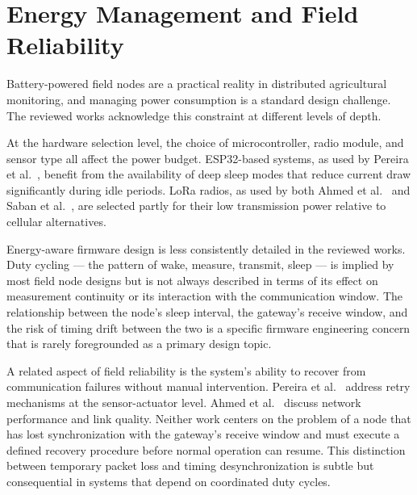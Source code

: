 \section{Energy Management and Field Reliability}
\label{sec:energy-reliability}

Battery-powered field nodes are a practical reality in distributed agricultural
monitoring, and managing power consumption is a standard design challenge. The
reviewed works acknowledge this constraint at different levels of depth.

At the hardware selection level, the choice of microcontroller, radio module,
and sensor type all affect the power budget. ESP32-based systems, as used by
Pereira et al.~\cite{pereira2023esp32_drip_irrigation}, benefit from the
availability of deep sleep modes that reduce current draw significantly during
idle periods. LoRa radios, as used by both Ahmed et
al.~\cite{ahmed2022lora_agriculture_chile} and Saban et
al.~\cite{saban2023smart_agricultural_lora_cloud}, are selected partly for
their low transmission power relative to cellular alternatives.

Energy-aware firmware design is less consistently detailed in the reviewed
works. Duty cycling --- the pattern of wake, measure, transmit, sleep --- is
implied by most field node designs but is not always described in terms of its
effect on measurement continuity or its interaction with the communication
window. The relationship between the node's sleep interval, the gateway's
receive window, and the risk of timing drift between the two is a specific
firmware engineering concern that is rarely foregrounded as a primary design
topic.

A related aspect of field reliability is the system's ability to recover from
communication failures without manual intervention. Pereira et
al.~\cite{pereira2023esp32_drip_irrigation} address retry mechanisms at the
sensor-actuator level. Ahmed et al.~\cite{ahmed2022lora_agriculture_chile}
discuss network performance and link quality. Neither work centers on the
problem of a node that has lost synchronization with the gateway's receive
window and must execute a defined recovery procedure before normal operation
can resume. This distinction between temporary packet loss and timing
desynchronization is subtle but consequential in systems that depend on
coordinated duty cycles.

